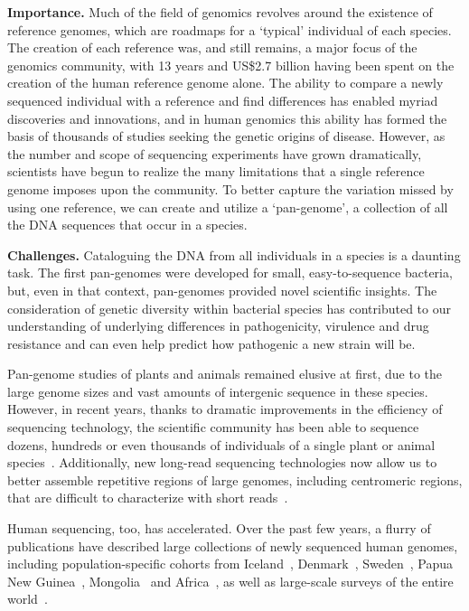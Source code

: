 \noindent
{\bf Importance.}
Much of the field of genomics revolves around the existence of reference genomes, which are roadmaps for a ‘typical’ individual of each species. The creation of each reference was, and still remains, a major focus of the genomics community, with 13 years and US\$2.7 billion having been spent on the creation of the human reference genome alone. The ability to compare a newly sequenced individual with a reference and find differences has enabled myriad discoveries and innovations, and in human genomics this ability has formed the basis of thousands of studies seeking the genetic origins of disease. However, as the number and scope of sequencing experiments have grown dramatically, scientists have begun to realize the many limitations that a single reference genome imposes upon the community. To better capture the variation missed by using one reference, we can create and utilize a ‘pan-genome’, a collection of all the DNA sequences that occur in a species.

\noindent
{\bf Challenges.}
Cataloguing the DNA from all individuals in a species is a daunting task. The first pan-genomes were developed for small, easy-to-sequence bacteria, but, even in that context, pan-genomes provided novel scientific insights. The consideration of genetic diversity within bacterial species has contributed to our understanding of underlying differences in pathogenicity, virulence and drug resistance and can even help predict how pathogenic a new strain will be.

Pan-genome studies of plants and animals remained elusive at first, due to the large genome sizes and vast amounts of intergenic sequence in these species. However, in recent years, thanks to dramatic improvements in the efficiency of sequencing technology, the scientific community has been able to sequence dozens, hundreds or even thousands of individuals of a single plant or animal species~\cite{XXX}. Additionally, new long-read sequencing technologies now allow us to better assemble repetitive regions of large genomes, including centromeric regions, that are difficult to characterize with short reads~\cite{XXX}.

Human sequencing, too, has accelerated. Over the past few years, a flurry of publications have described large collections of newly sequenced human genomes, including population-specific cohorts from Iceland~\cite{XXX}, Denmark~\cite{XXX}, Sweden~\cite{XXX}, Papua New Guinea~\cite{XXX}, Mongolia~\cite{XXX} and Africa~\cite{XXX}, as well as large-scale surveys of the entire world~\cite{XXX}.

